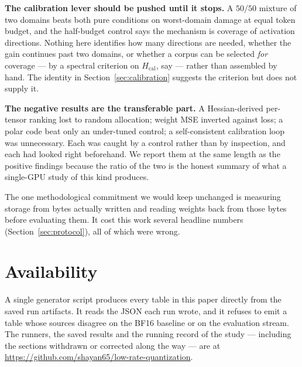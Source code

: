 \documentclass[11pt]{article}
\begin{document}
\textbf{The calibration lever should be pushed until it stops.} A $50/50$
mixture of two domains beats both pure conditions on worst-domain damage at
equal token budget, and the half-budget control says the mechanism is coverage
of activation directions. Nothing here identifies how many directions are
needed, whether the gain continues past two domains, or whether a corpus can be
selected \emph{for} coverage --- by a spectral criterion on $H_{\mathrm{cal}}$,
say --- rather than assembled by hand. The identity in
Section~\ref{sec:calibration} suggests the criterion but does not supply it.

\textbf{The negative results are the transferable part.} A Hessian-derived
per-tensor ranking lost to random allocation; weight MSE inverted against loss;
a polar code beat only an under-tuned control; a self-consistent calibration
loop was unnecessary. Each was caught by a control rather than by inspection,
and each had looked right beforehand. We report them at the same length as the
positive findings because the ratio of the two is the honest summary of what a
single-GPU study of this kind produces.

The one methodological commitment we would keep unchanged is measuring storage
from bytes actually written and reading weights back from those bytes before
evaluating them. It cost this work several headline numbers
(Section~\ref{sec:protocol}), all of which were wrong.

\section*{Availability}

A single generator script produces every table in this paper directly from the
saved run artifacts. It reads the JSON each run wrote, and it refuses to emit a
table whose sources disagree on the BF16 baseline or on the evaluation stream. The runners, the saved results and the running record of the
study --- including the sections withdrawn or corrected along the way --- are at
\url{https://github.com/shayan65/low-rate-quantization}.
\end{document}
